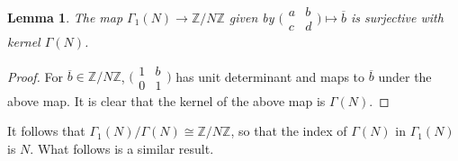 \documentclass[10pt,leqno,twoside,b5paper]{article}
\theoremstyle{plain}
\newtheorem{lemma}[lem]{Lemma}
\theoremstyle{definition}
\numberwithin{equation}{section}
\numberwithin{lem}{section}
\newcommand{\smod}[1]{\;(\bmod\; #1)}
\newcommand{\smallabcd}{\big(\!\begin{smallmatrix}
    a & b \\ c & d
\end{smallmatrix}\!\big)}
\begin{document}
\begin{lemma}\label{lem: principal normal in gamma 1}
    The map $\varGamma_1(N)\to \mathbb{Z}/N\mathbb{Z}$ given by $\smallabcd\mapsto \overline b$ is surjective with kernel $\varGamma(N)$. 
\end{lemma}
\begin{proof}
    For $\overline b\in\mathbb{Z}/N\mathbb{Z}$, $\big(\!\begin{smallmatrix}
        1 & b \\ 0 & 1
    \end{smallmatrix}\!\big)$ has unit determinant and maps to $\overline b$ under the above map. It is clear that the kernel of the above map is $\varGamma(N)$.
\end{proof} 
It follows that $\varGamma_1(N)/\varGamma(N)\cong \mathbb{Z}/N\mathbb{Z}$, so that the index of $\varGamma(N)$ in $\varGamma_1(N)$ is $N$. What follows is a similar result.
\end{document}
